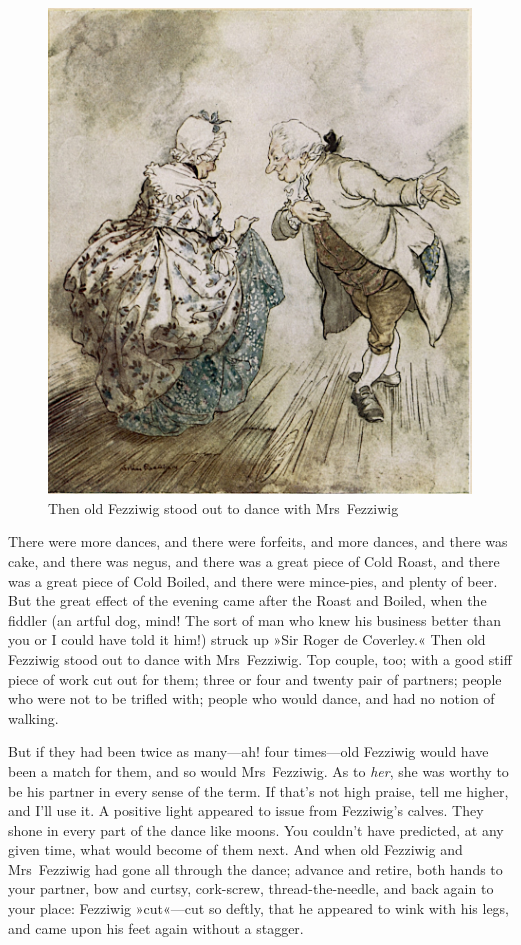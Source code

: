 \begin{figure}[p]
\begin{minipage}[c]{\textwidth}
\includegraphics[width=\textwidth]{fezzidanceimproved}
\caption[\textbf{To dance with Mrs~Fezziwig}]{Then old Fezziwig stood out to dance with Mrs~Fezziwig}
\end{minipage}
\end{figure}


There were more dances, and there were forfeits, and more dan\-ces, and there was cake, and there was negus, and there was a great piece of Cold Roast, and there was a great piece of Cold Boiled, and there were mince-pies, and plenty of beer. But the great effect of the evening came after the Roast and Boiled, when the fiddler (an artful dog, mind! The sort of man who knew his business better than you or I could have told it him!) struck up »Sir Roger de Coverley.« Then old Fezziwig stood out to dance with Mrs~Fezziwig. Top couple, too; with a good stiff piece of work cut out for them; three or four and twenty pair of partners; people who were not to be trifled with; people who would dance, and had no notion of walking.

But if they had been twice as many—ah! four times—old Fezziwig would have been a match for them, and so would Mrs~Fezziwig. As to \textit{her}, she was worthy to be his partner in every sense of the term. If that's not high praise, tell me higher, and I'll use it. A positive light appeared to issue from Fezziwig's calves. They shone in every part of the dance like moons. You couldn't have predicted, at any given time, what would become of them next. And when old Fezziwig and Mrs~Fezziwig had gone all through the dance; advance and retire, both hands to your partner, bow and curtsy, cork-screw, thread-the-needle, and back again to your place: Fezziwig »cut«—cut so deftly, that he appeared to wink with his legs, and came upon his feet again without a stagger.

